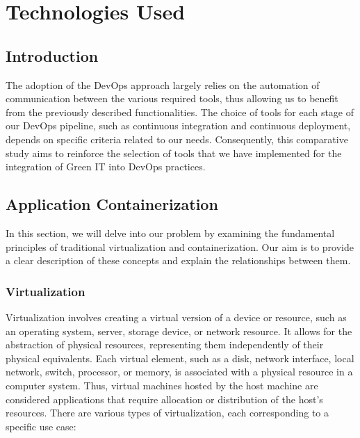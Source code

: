 \chapter{Technologies Used}
\label{chap:Chapter 3 title}

\section{Introduction}
The adoption of the DevOps approach largely relies on the automation of communication between the various required tools, thus allowing us to benefit from the previously described functionalities. The choice of tools for each stage of our DevOps pipeline, such as continuous integration and continuous deployment, depends on specific criteria related to our needs. Consequently, this comparative study aims to reinforce the selection of tools that we have implemented for the integration of Green IT into DevOps practices.

\newpage


\section{Application Containerization}
In this section, we will delve into our problem by examining the fundamental principles of traditional virtualization and containerization. Our aim is to provide a clear description of these concepts and explain the relationships between them.

\subsection{Virtualization}
Virtualization involves creating a virtual version of a device or resource, such as an operating system, server, storage device, or network resource. It allows for the abstraction of physical resources, representing them independently of their physical equivalents. Each virtual element, such as a disk, network interface, local network, switch, processor, or memory, is associated with a physical resource in a computer system. Thus, virtual machines hosted by the host machine are considered applications that require allocation or distribution of the host's resources. There are various types of virtualization, each corresponding to a specific use case:

